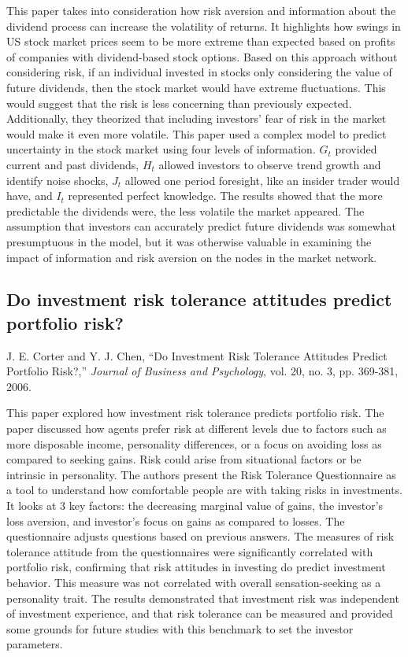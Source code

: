 \documentclass[12pt]{article}
\begin{document}
This paper takes into consideration how risk aversion and information about the dividend process can increase the volatility of returns. It highlights how swings in US stock market prices seem to be more extreme than expected based on profits of companies with dividend-based stock options. Based on this approach without considering risk, if an individual invested in stocks only considering the value of future dividends, then the stock market would have extreme fluctuations. This would suggest that the risk is less concerning than previously expected. Additionally, they theorized that including investors’ fear of risk in the market would make it even more volatile. This paper used a complex model to predict uncertainty in the stock market using four levels of information. $G_t$ provided current and past dividends, $H_t$ allowed investors to observe trend growth and identify noise shocks, $J_t$ allowed one period foresight, like an insider trader would have, and $I_t$ represented perfect knowledge. The results showed that the more predictable the dividends were, the less volatile the market appeared. The assumption that investors can accurately predict future dividends was somewhat presumptuous in the model, but it was otherwise valuable in examining the impact of information and risk aversion on the nodes in the market network.


\subsection{Do investment risk tolerance attitudes predict portfolio risk?}
J. E. Corter and Y. J. Chen, “Do Investment Risk Tolerance Attitudes Predict Portfolio Risk?,” \textit{Journal of Business and Psychology}, vol. 20, no. 3, pp. 369-381, 2006.
\newline

This paper explored how investment risk tolerance predicts portfolio risk. The paper discussed how agents prefer risk at different levels due to factors such as more disposable income, personality differences, or a focus on avoiding loss as compared to seeking gains. Risk could arise from situational factors or be intrinsic in personality. The authors present the Risk Tolerance Questionnaire as a tool to understand how comfortable people are with taking risks in investments. It looks at 3 key factors: the decreasing marginal value of gains, the investor's loss aversion, and investor's focus on gains as compared to losses. The questionnaire adjusts questions based on previous answers. The measures of risk tolerance attitude from the questionnaires were significantly correlated with portfolio risk, confirming that risk attitudes in investing do predict investment behavior. This measure was not correlated with overall sensation-seeking as a personality trait. The results demonstrated that investment risk was independent of investment experience, and that risk tolerance can be measured and provided some grounds for future studies with this benchmark to set the investor parameters.
\end{document}
